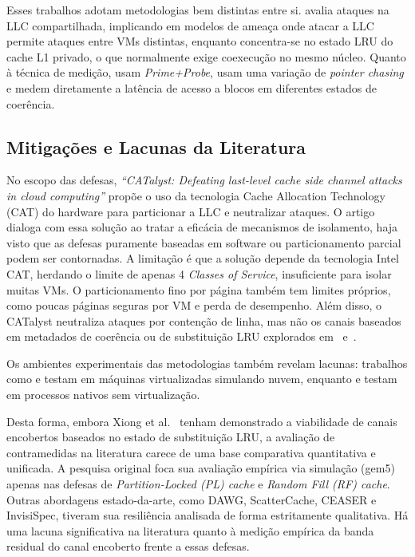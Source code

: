 \documentclass[12pt]{article}
\begin{document}
Esses trabalhos adotam metodologias bem distintas entre si. \cite{7163050} avalia ataques na LLC compartilhada, implicando em modelos de ameaça onde atacar a LLC permite ataques entre VMs distintas, enquanto \cite{9065598} concentra-se no estado LRU do cache L1 privado, o que normalmente exige coexecução no mesmo núcleo. Quanto à técnica de medição, \cite{7163050} usam \textit{Prime+Probe}, \cite{9065598} usam uma variação de \textit{pointer chasing} e \cite{8327007} medem diretamente a latência de acesso a blocos em diferentes estados de coerência.

\subsection{Mitigações e Lacunas da Literatura}

No escopo das defesas, \textit{“CATalyst: Defeating last-level cache side channel attacks in cloud computing”}\cite{7446082} propõe o uso da tecnologia Cache Allocation Technology (CAT) do hardware para particionar a LLC e neutralizar ataques. O artigo dialoga com essa solução ao tratar a eficácia de mecanismos de isolamento, haja visto que as defesas puramente baseadas em software ou particionamento parcial podem ser contornadas. A limitação é que a solução depende da tecnologia Intel CAT, herdando o limite de apenas 4 \textit{Classes of Service}, insuficiente para isolar muitas VMs. O particionamento fino por página também tem limites próprios, como poucas páginas seguras por VM e perda de desempenho. Além disso, o CATalyst neutraliza ataques por contenção de linha, mas não os canais baseados em metadados de coerência ou de substituição LRU explorados em~\cite{8327007} e~\cite{9065598}.

Os ambientes experimentais das metodologias também revelam lacunas: trabalhos como \cite{7163050} e \cite{7446082} testam em máquinas virtualizadas simulando nuvem, enquanto \cite{8327007} e \cite{9065598} testam em processos nativos sem virtualização. 

Desta forma, embora Xiong et al.~\cite{9354935} tenham demonstrado a viabilidade de canais encobertos baseados no estado de substituição LRU, a avaliação de contramedidas na literatura carece de uma base comparativa quantitativa e unificada. A pesquisa original foca sua avaliação empírica via simulação (gem5) apenas nas defesas de \textit{Partition-Locked (PL) cache} e \textit{Random Fill (RF) cache}. Outras abordagens estado-da-arte, como DAWG, ScatterCache, CEASER e InvisiSpec, tiveram sua resiliência analisada de forma estritamente qualitativa. Há uma lacuna significativa na literatura quanto à medição empírica da banda residual do canal encoberto frente a essas defesas.
\end{document}

